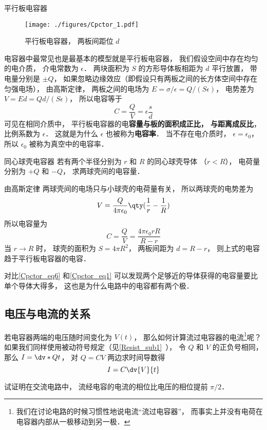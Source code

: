 \begin{example}{平行板电容器}\label{Cpctor_ex2}
\begin{figure}[ht]
\centering
\texttt{[image: ./figures/Cpctor\_1.pdf]}
\caption{平行板电容器， 两板间距位 $d$} \label{Cpctor_fig1}
\end{figure}
电容器中最常见也是最基本的模型就是平行板电容器， 我们假设空间中存在均匀的电介质， 介电常数为 $\epsilon$． 两块面积为 $S$ 的方形导体板相距为 $d$ 平行放置， 带电量分别是 $\pm Q$， 如果忽略边缘效应（即假设只有两板之间的长方体空间中存在匀强电场）， 由高斯定律，%
两板之间的电场为 $E = {\sigma}/{\epsilon} = Q/(S\epsilon)$， 电势差为 $V = Ed = Qd/(S\epsilon)$， 所以电容等于
\begin{equation}\label{Cpctor_eq4}
C = \frac{Q}{V} = \epsilon \frac sd
\end{equation}
可见在相同介质中， 平行板电容器的电\textbf{容量与板的面积成正比， 与距离成反比}， 比例系数为 $\epsilon$． 这就是为什么 $\epsilon$ 也被称为\textbf{电容率}． 当不存在电介质时， $\epsilon = \epsilon_0$， 所以 $\epsilon_0$ 被称为真空中的电容率．
\end{example}

\begin{example}{同心球壳电容器}
若有两个半径分别为 $r$ 和 $R$ 的同心球壳导体 （$r < R$）， 电荷量分别为 $+Q$ 和 $-Q$， 求两球壳间的电容量．

由高斯定律%
两球壳间的电场只与小球壳的电荷量有关， 所以两球壳的电势差为
\begin{equation}
V = \frac{Q}{4\pi\epsilon_0} \qty(\frac 1r - \frac 1R)
\end{equation}
所以电容量为
\begin{equation}\label{Cpctor_eq6}
C = \frac QV = \frac{4\pi\epsilon_0 rR}{R - r}
\end{equation}
当 $r\to R$ 时， 球壳的面积为 $S = 4\pi R^2$， 两板间距为 $d = R - r$， 则上式的电容趋于平行板电容器的电容．
\end{example}

对比\autoref{Cpctor_eq6} 和\autoref{Cpctor_eq1} 可以发现两个足够近的导体获得的电容量要比单个导体大得多， 这也是为什么电路中的电容都有两个极．

\subsection{电压与电流的关系}
若电容器两端的电压随时间变化为 $V(t)$， 那么如何计算流过电容器的电流\footnote{我们在讨论电路的时候习惯性地说电流“流过电容器”， 而事实上并没有电荷在电容器内部从一极移动到另一极．}呢？ 如果我们同样使用被动符号规定（见\autoref{Resist_sub1}~）， 令 $Q$ 和 $V$ 的正负号相同， 那么 $I = \dv*{Q}{t}$， 对 $Q = CV$ 两边求时间导数得
\begin{equation}\label{Cpctor_eq3}
I = C\dv{V}{t}
\end{equation}
\begin{exercise}{}
试证明在交流电路中， 流经电容的电流的相位比电压的相位提前 $\pi/2$．
\end{exercise}

